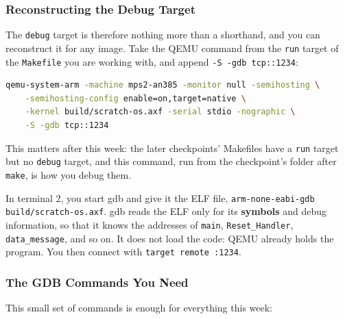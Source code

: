 \subsubsection{Reconstructing the Debug Target}
The \texttt{debug} target is therefore nothing more than a shorthand, and you can reconstruct it for any image. Take the QEMU command from the \texttt{run} target of the \texttt{Makefile} you are working with, and append \texttt{-S -gdb tcp::1234}:

\begin{lstlisting}[language=bash]
qemu-system-arm -machine mps2-an385 -monitor null -semihosting \
    -semihosting-config enable=on,target=native \
    -kernel build/scratch-os.axf -serial stdio -nographic \
    -S -gdb tcp::1234
\end{lstlisting}

This matters after this week: the later checkpoints' Makefiles have a \texttt{run} target but no \texttt{debug} target, and this command, run from the checkpoint's folder after \texttt{make}, is how you debug them.

In terminal 2, you start gdb and give it the ELF file, \texttt{arm-none-eabi-gdb build/scratch-os.axf}. gdb reads the ELF only for its \textbf{symbols} and debug information, so that it knows the addresses of \texttt{main}, \texttt{Reset\_Handler}, \texttt{data\_message}, and so on. It does not load the code: QEMU already holds the program. You then connect with \texttt{target remote :1234}.

\subsubsection{The GDB Commands You Need}
This small set of commands is enough for everything this week:

